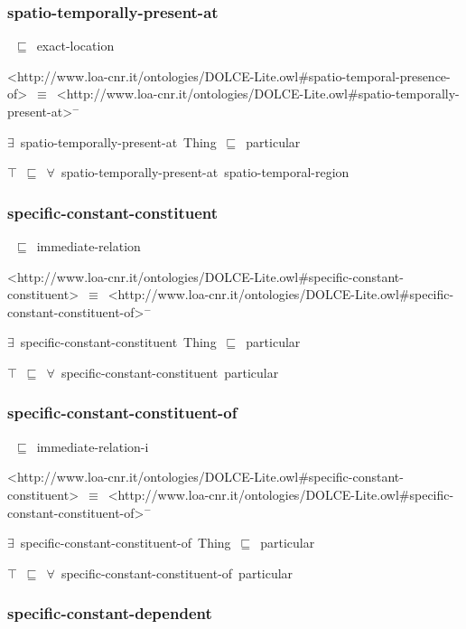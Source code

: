 \documentclass{article}
\begin{document}
\subsubsection*{spatio-temporally-present-at}

~\ensuremath{\sqsubseteq}~exact-location

<http://www.loa-cnr.it/ontologies/DOLCE-Lite.owl#spatio-temporal-presence-of>~\ensuremath{\equiv}~<http://www.loa-cnr.it/ontologies/DOLCE-Lite.owl#spatio-temporally-present-at>\ensuremath{^-}

\ensuremath{\exists}~spatio-temporally-present-at~Thing~\ensuremath{\sqsubseteq}~particular

\ensuremath{\top}~\ensuremath{\sqsubseteq}~\ensuremath{\forall}~spatio-temporally-present-at~spatio-temporal-region

\subsubsection*{specific-constant-constituent}

~\ensuremath{\sqsubseteq}~immediate-relation

<http://www.loa-cnr.it/ontologies/DOLCE-Lite.owl#specific-constant-constituent>~\ensuremath{\equiv}~<http://www.loa-cnr.it/ontologies/DOLCE-Lite.owl#specific-constant-constituent-of>\ensuremath{^-}

\ensuremath{\exists}~specific-constant-constituent~Thing~\ensuremath{\sqsubseteq}~particular

\ensuremath{\top}~\ensuremath{\sqsubseteq}~\ensuremath{\forall}~specific-constant-constituent~particular

\subsubsection*{specific-constant-constituent-of}

~\ensuremath{\sqsubseteq}~immediate-relation-i

<http://www.loa-cnr.it/ontologies/DOLCE-Lite.owl#specific-constant-constituent>~\ensuremath{\equiv}~<http://www.loa-cnr.it/ontologies/DOLCE-Lite.owl#specific-constant-constituent-of>\ensuremath{^-}

\ensuremath{\exists}~specific-constant-constituent-of~Thing~\ensuremath{\sqsubseteq}~particular

\ensuremath{\top}~\ensuremath{\sqsubseteq}~\ensuremath{\forall}~specific-constant-constituent-of~particular

\subsubsection*{specific-constant-dependent}
\end{document}
